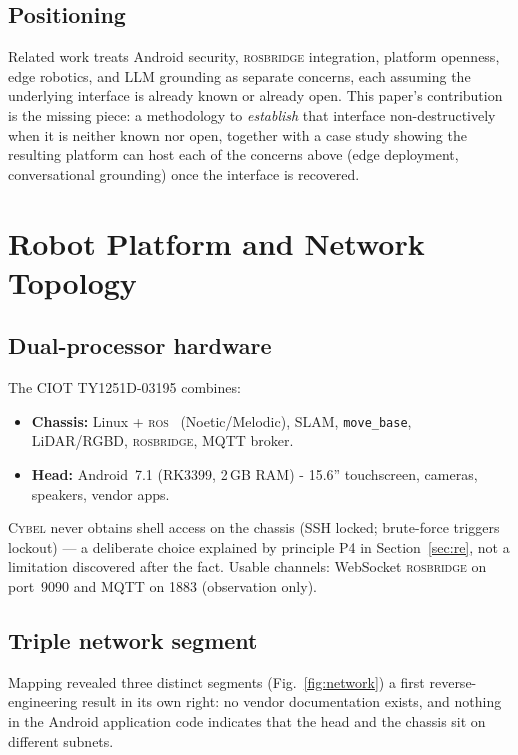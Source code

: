\documentclass[conference]{IEEEtran}
\newcommand{\ros}{\textsc{ros}}
\newcommand{\rosbridge}{\textsc{rosbridge}}
\newcommand{\cybel}{\textsc{Cybel}}
\begin{document}
\subsection{Positioning}
Related work treats Android security, \rosbridge{} integration, platform openness, edge robotics, and LLM grounding as separate concerns, each assuming the underlying interface is already known or already open. 
This paper's contribution is the missing piece: a methodology to \emph{establish} that interface non-destructively when it is neither known nor open, together with a case study showing the resulting platform can host each of the concerns above (edge deployment, conversational grounding) once the interface is recovered.

\section{Robot Platform and Network Topology}
\label{sec:platform}

\subsection{Dual-processor hardware}

The CIOT TY1251D-03195 combines:
\begin{itemize}
\item \textbf{Chassis:} Linux + \ros{}~\cite{quigley2009ros} (Noetic/Melodic), SLAM, \texttt{move\_base}, LiDAR/RGBD, \rosbridge{}, MQTT broker.
\item \textbf{Head:} Android~7.1 (RK3399, 2\,GB RAM) - 15.6'' touchscreen, cameras, speakers, vendor apps.
\end{itemize}

\cybel{} never obtains shell access on the chassis (SSH locked; brute-force triggers lockout) --- a deliberate choice explained by principle P4 in Section~\ref{sec:re}, not a limitation discovered after the fact.
Usable channels: WebSocket \rosbridge{} on port~9090 and MQTT on 1883 (observation only).

\subsection{Triple network segment}

Mapping revealed three distinct segments (Fig.~\ref{fig:network}) a first reverse-engineering result in its own right: no vendor documentation exists, and nothing in the Android application code indicates that the head and the chassis sit on different subnets.
\end{document}
